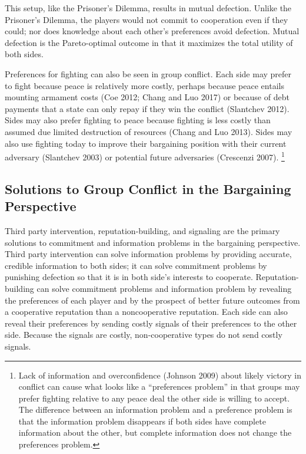 \documentclass[11pt]{article}
\begin{document}
This setup, like the Prisoner's Dilemma, results in mutual defection.
Unlike the Prisoner's Dilemma, the players would not commit to
cooperation even if they could; nor does knowledge about each other's
preferences avoid defection. Mutual defection is the Pareto-optimal
outcome in that it maximizes the total utility of both sides.

Preferences for fighting can also be seen in group conflict. Each side
may prefer to fight because peace is relatively more costly, perhaps
because peace entails mounting armament costs (Coe 2012; Chang and Luo
2017) or because of debt payments that a state can only repay if they
win the conflict (Slantchev 2012). Sides may also prefer fighting to
peace because fighting is less costly than assumed due limited
destruction of resources (Chang and Luo 2013). Sides may also use
fighting today to improve their bargaining position with their current
adversary (Slantchev 2003) or potential future adversaries (Crescenzi
2007). \footnote{Lack of information and overconfidence (Johnson 2009)
  about likely victory in conflict can cause what looks like a
  ``preferences problem'' in that groups may prefer fighting relative to
  any peace deal the other side is willing to accept. The difference
  between an information problem and a preference problem is that the
  information problem disappears if both sides have complete information
  about the other, but complete information does not change the
  preferences problem.}

\hypertarget{solutions-to-group-conflict-in-the-bargaining-perspective}{%
\subsection{Solutions to Group Conflict in the Bargaining
Perspective}\label{solutions-to-group-conflict-in-the-bargaining-perspective}}

Third party intervention, reputation-building, and signaling are the
primary solutions to commitment and information problems in the
bargaining perspective. Third party intervention can solve information
problems by providing accurate, credible information to both sides; it
can solve commitment problems by punishing defection so that it is in
both side's interests to cooperate. Reputation-building can solve
commitment problems and information problem by revealing the preferences
of each player and by the prospect of better future outcomes from a
cooperative reputation than a noncooperative reputation. Each side can
also reveal their preferences by sending costly signals of their
preferences to the other side. Because the signals are costly,
non-cooperative types do not send costly signals.
\end{document}
